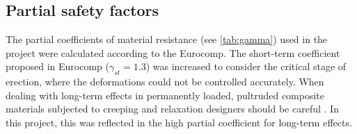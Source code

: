 

\subsection{Partial safety factors}\label{sec=safety}
The partial coefficients of material resistance (see \cref{tab:gamma}) used in the project were calculated according to the Eurocomp. The short-term coefficient proposed in Eurocomp ($\gamma_{st} = 1.3$) was increased to consider the critical stage of erection, where the deformations could not be controlled accurately.
When dealing with long-term effects in permanently loaded, pultruded composite materials subjected to creeping and relaxation designers should be careful  \cite{Kotelnikova2012,Bank2006}. In this project, this was reflected in the high partial coefficient for long-term effects.

